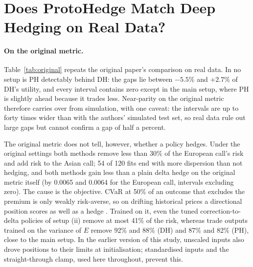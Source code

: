 \documentclass[runningheads]{llncs}
\begin{document}
\section{Does ProtoHedge Match Deep Hedging on Real Data?}
\label{sec:results}

\begin{table}[t]
\caption{The original paper's comparison on simulated and real data. Gain over not hedging in CVaR at 50\%
of the outcome $O$ (fractions of the initial price; higher is better), PH minus DH with 95\% interval, the
difference relative to DH's utility, and the share of risk removed. Real data: test period 2022--2024, ten
tickers weighted equally, seeds averaged. $^{\dagger}$Interval computed after the main evaluation.}
\label{tab:original}
\centering
\scriptsize
\setlength{\tabcolsep}{2.1pt}

\end{table}

\paragraph{On the original metric.} Table~\ref{tab:original} repeats the original paper's comparison on
real data. In no setup is PH detectably behind DH: the gaps lie between $-5.5\%$ and $+2.7\%$ of DH's
utility, and every interval contains zero except in the main setup, where PH is slightly ahead because it
trades less. Near-parity on the original metric therefore carries over from simulation,
with one caveat: the intervals are up to forty times wider than with the authors' simulated test set, so
real data rule out large gaps but cannot confirm a gap of half a percent.

The original metric does not tell, however, whether a policy hedges. Under the original settings both
methods remove less than 30\% of the European call's risk and add risk to the Asian call; 54 of 120 fits end
with more dispersion than not hedging, and both methods gain less than a plain delta hedge on the original
metric itself (by 0.0065 and 0.0064 for the European call, intervals excluding zero). The cause is the
objective. CVaR at 50\% of an outcome that excludes the premium is only weakly risk-averse, so on drifting
historical prices a directional position scores as well as a hedge \cite{buehler2021drift}. Trained on it,
even the tuned correction-to-delta policies of setup (ii) remove at most 41\% of the risk, whereas trade
outputs trained on the variance of $E$ remove 92\% and 88\% (DH) and 87\% and 82\% (PH), close to the main
setup. In the earlier version of this study, unscaled inputs also drove positions to their limits at
initialisation; standardised inputs and the straight-through clamp, used here throughout, prevent this.
\end{document}
